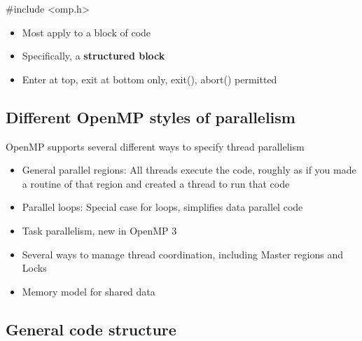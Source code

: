 \documentclass[%
oneside,                 %
final,                   %
10pt]{article}
\begin{document}
\noindent


\bcppcod
#include <omp.h>

\ecppcod

\begin{itemize}
 \item Most apply to a block of code

 \item Specifically, a \textbf{structured block}

 \item Enter at top, exit at bottom only, exit(), abort() permitted
\end{itemize}

\noindent
\subsection{Different OpenMP styles of parallelism}
OpenMP supports several different ways to specify thread parallelism

\begin{itemize}
\item General parallel regions: All threads execute the code, roughly as if you made a routine of that region and created a thread to run that code

\item Parallel loops: Special case for loops, simplifies data parallel code

\item Task parallelism, new in OpenMP 3

\item Several ways to manage thread coordination, including Master regions and Locks

\item Memory model for shared data
\end{itemize}

\noindent
\subsection{General code structure}

\paragraph{}
\end{document}
